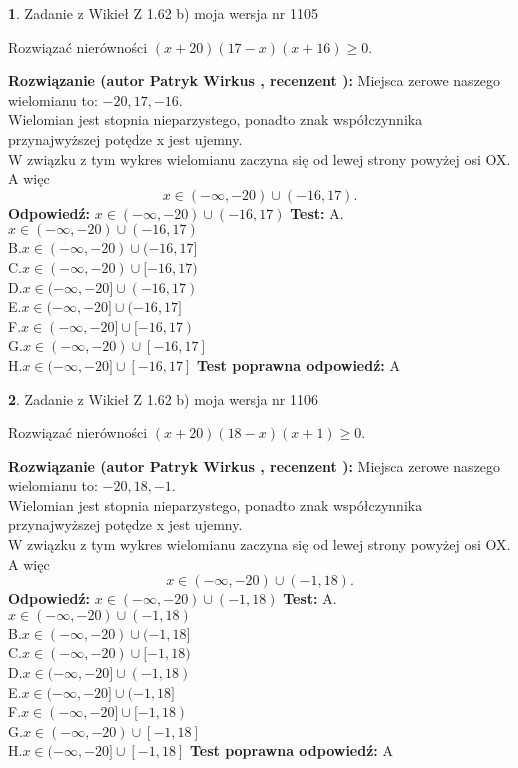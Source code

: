 \documentclass[12pt, a4paper]{article}
\theoremstyle{definition} %
\newtheorem{zad}{}
\newcommand{\zadStart}[1]{\begin{zad}#1\newline}
\newcommand{\zadStop}{\end{zad}}
\newcommand{\rozwStart}[2]{\noindent \textbf{Rozwiązanie (autor #1 , recenzent #2): }\newline}
\newcommand{\rozwStop}{\newline}
\newcommand{\odpStart}{\noindent \textbf{Odpowiedź:}\newline}
\newcommand{\odpStop}{\newline}
\newcommand{\testStart}{\noindent \textbf{Test:}\newline}
\newcommand{\testStop}{\newline}
\newcommand{\kluczStart}{\noindent \textbf{Test poprawna odpowiedź:}\newline}
\newcommand{\kluczStop}{\newline}
\begin{document}
\zadStart{Zadanie z Wikieł Z 1.62 b) moja wersja nr 1105}

Rozwiązać nierówności $(x+20)(17-x)(x+16)\ge0$.
\zadStop
\rozwStart{Patryk Wirkus}{}
Miejsca zerowe naszego wielomianu to: $-20, 17, -16$.\\
Wielomian jest stopnia nieparzystego, ponadto znak współczynnika przy\linebreak najwyższej potędze x jest ujemny.\\ W związku z tym wykres wielomianu zaczyna się od lewej strony powyżej osi OX. A więc $$x \in (-\infty,-20) \cup (-16,17).$$
\rozwStop
\odpStart
$x \in (-\infty,-20) \cup (-16,17)$
\odpStop
\testStart
A.$x \in (-\infty,-20) \cup (-16,17)$\\
B.$x \in (-\infty,-20) \cup (-16,17]$\\
C.$x \in (-\infty,-20) \cup [-16,17)$\\
D.$x \in (-\infty,-20] \cup (-16,17)$\\
E.$x \in (-\infty,-20] \cup (-16,17]$\\
F.$x \in (-\infty,-20] \cup [-16,17)$\\
G.$x \in (-\infty,-20) \cup [-16,17]$\\
H.$x \in (-\infty,-20] \cup [-16,17]$
\testStop
\kluczStart
A
\kluczStop



\zadStart{Zadanie z Wikieł Z 1.62 b) moja wersja nr 1106}

Rozwiązać nierówności $(x+20)(18-x)(x+1)\ge0$.
\zadStop
\rozwStart{Patryk Wirkus}{}
Miejsca zerowe naszego wielomianu to: $-20, 18, -1$.\\
Wielomian jest stopnia nieparzystego, ponadto znak współczynnika przy\linebreak najwyższej potędze x jest ujemny.\\ W związku z tym wykres wielomianu zaczyna się od lewej strony powyżej osi OX. A więc $$x \in (-\infty,-20) \cup (-1,18).$$
\rozwStop
\odpStart
$x \in (-\infty,-20) \cup (-1,18)$
\odpStop
\testStart
A.$x \in (-\infty,-20) \cup (-1,18)$\\
B.$x \in (-\infty,-20) \cup (-1,18]$\\
C.$x \in (-\infty,-20) \cup [-1,18)$\\
D.$x \in (-\infty,-20] \cup (-1,18)$\\
E.$x \in (-\infty,-20] \cup (-1,18]$\\
F.$x \in (-\infty,-20] \cup [-1,18)$\\
G.$x \in (-\infty,-20) \cup [-1,18]$\\
H.$x \in (-\infty,-20] \cup [-1,18]$
\testStop
\kluczStart
A
\kluczStop
\end{document}
